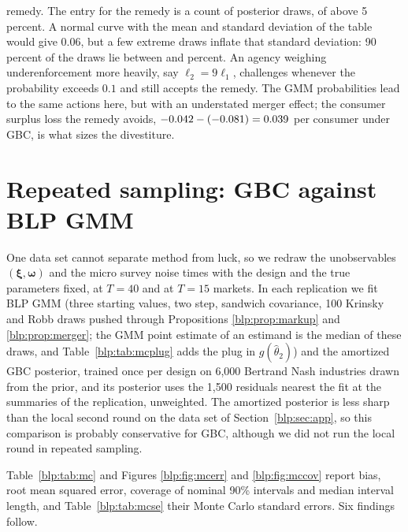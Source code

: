 \begin{enumerate}
remedy. The entry for the remedy is a count of posterior draws, \numcerprgbcnabove{} of \numcerngbcdraws{} above 5 percent. A normal curve with the mean and standard deviation of the table would give 0.06, but a few extreme draws inflate that standard deviation: 90 percent of the draws lie between \numcerdprgbcqlo{} and \numcerdprgbcqhi{} percent. An agency weighing underenforcement more heavily, say $\ell_2 = 9\ell_1$, challenges whenever the probability exceeds $0.1$ and still accepts the remedy. The GMM probabilities lead to the same actions here, but with an understated merger effect; the consumer surplus loss the remedy avoids, $-0.042 - (-0.081) = 0.039$ per
consumer under GBC, is what sizes the divestiture.
\end{enumerate}

\section[Repeated sampling]{Repeated sampling: GBC against BLP GMM}\label{blp:sec:mc}

One data set cannot separate method from luck, so we redraw the
unobservables $(\bm\xi,\bm\omega)$ and the micro survey noise \nummcnxv{} times with the design and
the true parameters fixed, at $T=40$ and at $T=15$ markets. In each
replication we fit BLP GMM (three starting values, two step, sandwich covariance, 100 Krinsky and
Robb draws pushed through Propositions \ref{blp:prop:markup} and \ref{blp:prop:merger}; the GMM point
estimate of an estimand is the median of these draws, and Table~\ref{blp:tab:mcplug} adds the plug in $g(\hat\theta_2)$) and the amortized GBC posterior, trained once per design on 6{,}000 Bertrand
Nash industries drawn from the prior, and its posterior uses the 1{,}500 residuals nearest the fit at the summaries of the replication, unweighted. The amortized posterior is less sharp than the local second round on the data set of Section~\ref{blp:sec:app}, so this comparison is probably conservative for GBC, although we did not run the local round in repeated sampling.

Table~\ref{blp:tab:mc} and Figures \ref{blp:fig:mcerr} and \ref{blp:fig:mccov} report bias, root mean
squared error, coverage of nominal 90\% intervals and median interval length, and Table~\ref{blp:tab:mcse} their Monte Carlo standard errors. Six findings
follow.

